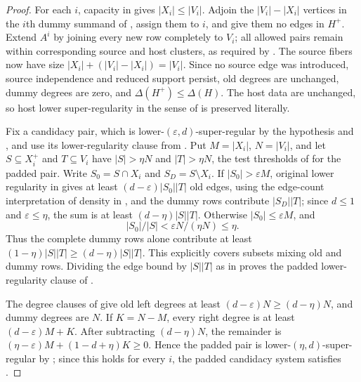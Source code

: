 \begin{proof}
For each $i$, capacity in  gives $|X_i|\leq|V_i|$.  Adjoin the $|V_i|-|X_i|$ vertices in the $i$th dummy summand of , assign them to $i$, and give them no edges in $H^+$.  Extend $A^i$ by joining every new row completely to $V_i$; all allowed pairs remain within corresponding source and host clusters, as required by .  The source fibers now have size $|X_i|+(|V_i|-|X_i|)=|V_i|$.  Since no source edge was introduced, source independence and reduced support persist, old degrees are unchanged, dummy degrees are zero, and $\Delta(H^+)\leq\Delta(H)$.  The host data are unchanged, so host lower super-regularity in the sense of  is preserved literally.

Fix a candidacy pair, which is lower-$(\varepsilon,d)$-super-regular by the hypothesis and , and use its lower-regularity clause from .  Put $M=|X_i|$, $N=|V_i|$, and let $S\subseteq X_i^+$ and $T\subseteq V_i$ have $|S|>\eta N$ and $|T|>\eta N$, the test thresholds of  for the padded pair.  Write $S_0=S\cap X_i$ and $S_D=S\setminus X_i$.  If $|S_0|>\varepsilon M$, original lower regularity in  gives at least $(d-\varepsilon)|S_0||T|$ old edges, using the edge-count interpretation of density in , and the dummy rows contribute $|S_D||T|$; since $d\leq1$ and $\varepsilon\leq\eta$, the sum is at least $(d-\eta)|S||T|$.  Otherwise $|S_0|\leq\varepsilon M$, and
\[
 |S_0|/|S|<\varepsilon N/(\eta N)\leq\eta.
\]
Thus the complete dummy rows alone contribute at least $(1-\eta)|S||T|\geq(d-\eta)|S||T|$.  This explicitly covers subsets mixing old and dummy rows.  Dividing the edge bound by $|S||T|$ as in  proves the padded lower-regularity clause of .

The degree clauses of  give old left degrees at least $(d-\varepsilon)N\geq(d-\eta)N$, and dummy degrees are $N$.  If $K=N-M$, every right degree is at least $(d-\varepsilon)M+K$.  After subtracting $(d-\eta)N$, the remainder is
$(\eta-\varepsilon)M+(1-d+\eta)K\geq0$.  Hence the padded pair is lower-$(\eta,d)$-super-regular by ; since this holds for every $i$, the padded candidacy system satisfies .


\end{proof}
